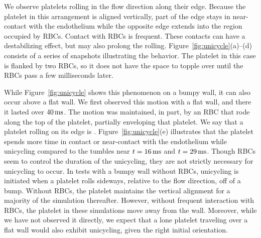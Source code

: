 We observe platelets rolling in the flow direction along their edge. Because the
platelet in this arrangement is aligned vertically, part of the edge stays in
near-contact with the endothelium while the opposite edge extends into the region
occupied by RBCs.  Contact with RBCs is frequent. These contacts can have a destabilizing
effect, but may also prolong the rolling. Figure~\ref{fig:unicycle}(a)--(d) consists of a
series of snapshots illustrating the behavior. The platelet in this case is flanked by
two RBCs, so it does not have the space to topple over until the RBCs pass a few
milliseconds later.

While Figure~\ref{fig:unicycle} shows this phenomenon on a bumpy wall, it can also occur
above a flat wall. We first observed this motion with a flat wall, and there it lasted
over $40\ms$. The motion was maintained, in part, by an RBC that rode along the top of
the platelet, partially enveloping that platelet. We say that a platelet rolling on its
edge is . Figure~\ref{fig:unicycle}(e) illustrates that the platelet
spends more time in contact or near-contact with the endothelium while unicycling
compared to the tumbles near $t=16\ms$ and $t=29\ms$. Though RBCs seem to control the
duration of the unicycling, they are not strictly necessary for unicycling to occur. In
tests with a bumpy wall without RBCs, unicycling is initiated when a platelet rolls
sideways, relative to the flow direction, off of a bump. Without RBCs, the platelet
maintains the vertical alignment for a majority of the simulation thereafter. However,
without frequent interaction with RBCs, the platelet in these simulations move away from
the wall.  Moreover, while we have not observed it directly, we expect that a lone
platelet traveling over a flat wall would also exhibit unicycling, given the right
initial orientation.

